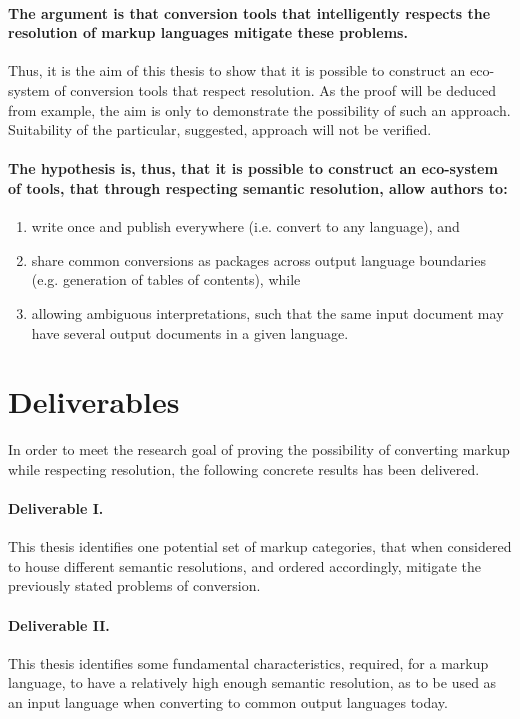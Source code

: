 \documentclass{scrreprt}
\begin{document}
\paragraph{The argument is that conversion tools that intelligently respects the resolution of markup languages mitigate these problems.} Thus, it is the aim of this thesis to show that it is possible to construct an eco-system of conversion tools that respect resolution. As the proof will be deduced from example, the aim is only to demonstrate the possibility of such an approach. Suitability of the particular, suggested, approach will not be verified.

\paragraph{The hypothesis is, thus, that it is possible to construct an eco-system of tools, that through respecting semantic resolution, allow authors to:}

\begin{enumerate}
\item write once and publish everywhere (i.e. convert to any language), and
\item share common conversions as packages across output language boundaries (e.g. generation of tables of contents), while
\item allowing ambiguous interpretations, such that the same input document may have several output documents in a given language.
\end{enumerate}



\section{Deliverables}
In order to meet the research goal of proving the possibility of converting markup while respecting resolution, the following concrete results has been delivered.

\paragraph{Deliverable I.} This thesis identifies one potential set of markup categories, that when considered to house different semantic resolutions, and ordered accordingly, mitigate the previously stated problems of conversion.

\paragraph{Deliverable II.} This thesis identifies some fundamental characteristics, required, for a markup language, to have a relatively high enough semantic resolution, as to be used as an input language when converting to common output languages today.
\end{document}
